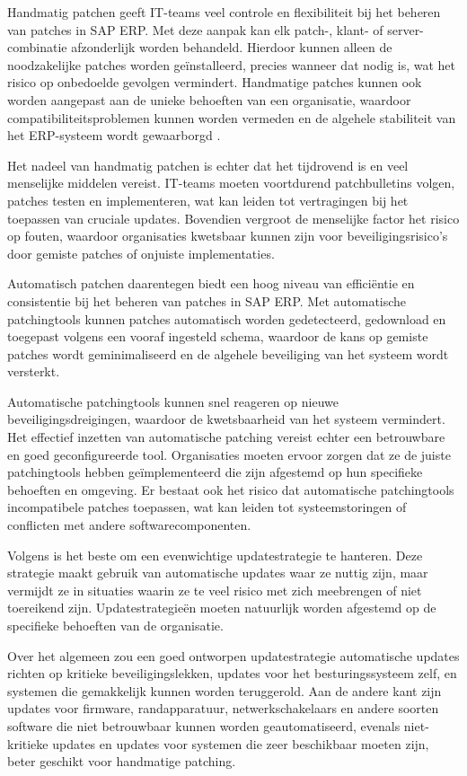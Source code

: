 Handmatig patchen geeft IT-teams veel controle en flexibiliteit bij het beheren van patches in SAP ERP. Met deze aanpak kan elk patch-, klant- of server-combinatie afzonderlijk worden behandeld. Hierdoor kunnen alleen de noodzakelijke patches worden geïnstalleerd, precies wanneer dat nodig is, wat het risico op onbedoelde gevolgen vermindert. Handmatige patches kunnen ook worden aangepast aan de unieke behoeften van een organisatie, waardoor compatibiliteitsproblemen kunnen worden vermeden en de algehele stabiliteit van het ERP-systeem wordt gewaarborgd \autocite{hooper2018}.

Het nadeel van handmatig patchen is echter dat het tijdrovend is en veel menselijke middelen vereist. IT-teams moeten voortdurend patchbulletins volgen, patches testen en implementeren, wat kan leiden tot vertragingen bij het toepassen van cruciale updates. Bovendien vergroot de menselijke factor het risico op fouten, waardoor organisaties kwetsbaar kunnen zijn voor beveiligingsrisico’s door gemiste patches of onjuiste implementaties.

Automatisch patchen daarentegen biedt een hoog niveau van efficiëntie en consistentie bij het beheren van patches in SAP ERP. Met automatische patchingtools kunnen patches automatisch worden gedetecteerd, gedownload en toegepast volgens een vooraf ingesteld schema, waardoor de kans op gemiste patches wordt geminimaliseerd en de algehele beveiliging van het systeem wordt versterkt.



Automatische patchingtools kunnen snel reageren op nieuwe beveiligingsdreigingen, waardoor de kwetsbaarheid van het systeem vermindert. Het effectief inzetten van automatische patching vereist echter een betrouwbare en goed geconfigureerde tool. Organisaties moeten ervoor zorgen dat ze de juiste patchingtools hebben geïmplementeerd die zijn afgestemd op hun specifieke behoeften en omgeving. Er bestaat ook het risico dat automatische patchingtools incompatibele patches toepassen, wat kan leiden tot systeemstoringen of conflicten met andere softwarecomponenten.

Volgens \textcite{tozzi2017} is het beste om een evenwichtige updatestrategie te hanteren. Deze strategie maakt gebruik van automatische updates waar ze nuttig zijn, maar vermijdt ze in situaties waarin ze te veel risico met zich meebrengen of niet toereikend zijn. Updatestrategieën moeten natuurlijk worden afgestemd op de specifieke behoeften van de organisatie.

Over het algemeen zou een goed ontworpen updatestrategie automatische updates richten op kritieke beveiligingslekken, updates voor het besturingssysteem zelf, en systemen die gemakkelijk kunnen worden teruggerold. Aan de andere kant zijn updates voor firmware, randapparatuur, netwerkschakelaars en andere soorten software die niet betrouwbaar kunnen worden geautomatiseerd, evenals niet-kritieke updates en updates voor systemen die zeer beschikbaar moeten zijn, beter geschikt voor handmatige patching.

